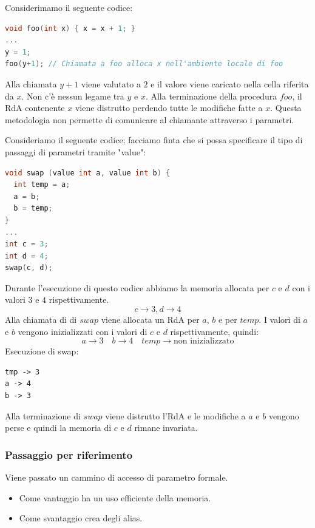 \documentclass[a4paper]{article}
\begin{document}
\begin{Example}{}{}
Considerimamo il seguente codice:
\begin{lstlisting}[language=c]
void foo(int x) { x = x + 1; } 
... 
y = 1; 
foo(y+1); // Chiamata a foo alloca x nell'ambiente locale di foo
\end{lstlisting}
Alla chiamata $y+1$ viene valutato a $2$ e il valore viene caricato nella cella 
riferita da $x$. Non c'è nessun legame tra $y$ e $x$.
Alla terminazione della procedura $foo$, il RdA contenente $x$ 
viene distrutto perdendo tutte le modifiche fatte a $x$.
Questa metodologia non permette di comunicare al chiamante
attraverso i parametri.
\end{Example}

\begin{Example}{}{}
Consideriamo il seguente codice; facciamo finta che si possa specificare 
il tipo di passaggi di parametri tramite "value":
\begin{lstlisting}[language=c]
void swap (value int a, value int b) {
  int temp = a; 
  a = b; 
  b = temp; 
}
... 
int c = 3;
int d = 4;
swap(c, d);
\end{lstlisting}
Durante l'esecuzione di questo codice abbiamo la memoria 
allocata per $c$ e $d$ con i valori $3$ e $4$ rispettivamente.
\[
  c \to 3, d \to 4
\]
Alla chiamata di di $swap$ viene allocata un RdA per $a$, $b$ e per $temp$. 
I valori di $a$ e $b$ vengono inizializzati con i valori di $c$ e $d$ rispettivamente, quindi:
\[
  a \to 3 \quad b \to 4 \quad temp \to \text{non inizializzato}
\]
Esecuzione di swap:
\begin{lstlisting}
tmp -> 3 
a -> 4
b -> 3
\end{lstlisting}
Alla terminazione di $swap$ viene distrutto l'RdA e le modifiche a $a$ e $b$ vengono perse e quindi 
la memoria di $c$ e $d$ rimane invariata.
\end{Example}


\subsubsection{Passaggio per riferimento} 

{
  Viene passato un cammino di accesso di parametro formale.
  \begin{itemize}
    \item Come vantaggio ha un uso efficiente della memoria.
    \item Come svantaggio crea degli alias.
  \end{itemize}
}
\end{document}
